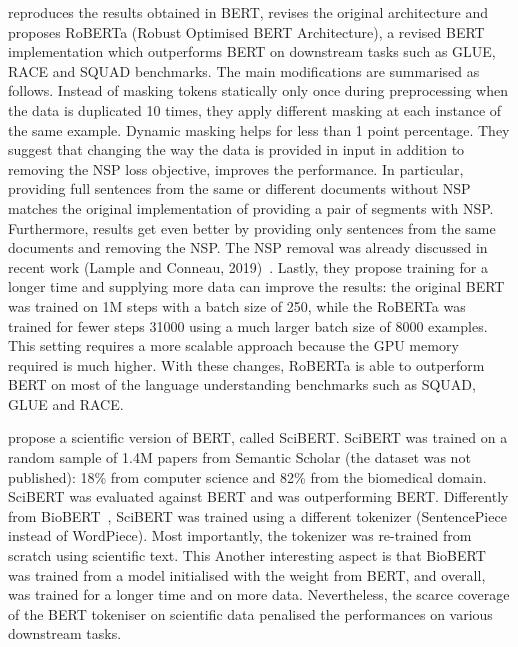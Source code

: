 \cite{liu2019roberta} reproduces the results obtained in BERT, revises the original architecture and proposes RoBERTa (Robust Optimised BERT Architecture), a revised BERT implementation which outperforms BERT on downstream tasks such as GLUE, RACE and SQUAD benchmarks. 
The main modifications are summarised as follows. Instead of masking tokens statically only once during preprocessing when the data is duplicated 10 times, they apply different masking at each instance of the same example. Dynamic masking helps for less than 1 point percentage.
They suggest that changing the way the data is provided in input in addition to removing the NSP loss objective, improves the performance. 
In particular, providing full sentences from the same or different documents without NSP matches the original implementation of providing a pair of segments with NSP. 
Furthermore, results get even better by providing only sentences from the same documents and removing the NSP.
The NSP removal was already discussed in recent work (Lample and Conneau, 2019)~\cite{lample2019cross}.
Lastly, they propose training for a longer time and supplying more data can improve the results: the original BERT was trained on 1M steps with a batch size of 250, while the RoBERTa was trained for fewer steps 31000 using a much larger batch size of 8000 examples. This setting requires a more scalable approach because the GPU memory required is much higher. 
With these changes, RoBERTa is able to outperform BERT on most of the language understanding benchmarks such as SQUAD, GLUE and RACE. 

\cite{Beltagy2019SciBERT} propose a scientific version of BERT, called SciBERT. 
SciBERT was trained on a random sample of 1.4M papers from Semantic Scholar (the dataset was not published): 18\% from computer science and 82\% from the biomedical domain. SciBERT was evaluated against BERT and was outperforming BERT. 
Differently from BioBERT~\cite{lee2019biobert}, SciBERT was trained using a different tokenizer (SentencePiece instead of WordPiece). Most importantly, the tokenizer was re-trained from scratch using scientific text. This 
Another interesting aspect is that BioBERT was trained from a model initialised with the weight from BERT, and overall, was trained for a longer time and on more data. Nevertheless, the scarce coverage of the BERT tokeniser on scientific data penalised the performances on various downstream tasks.


